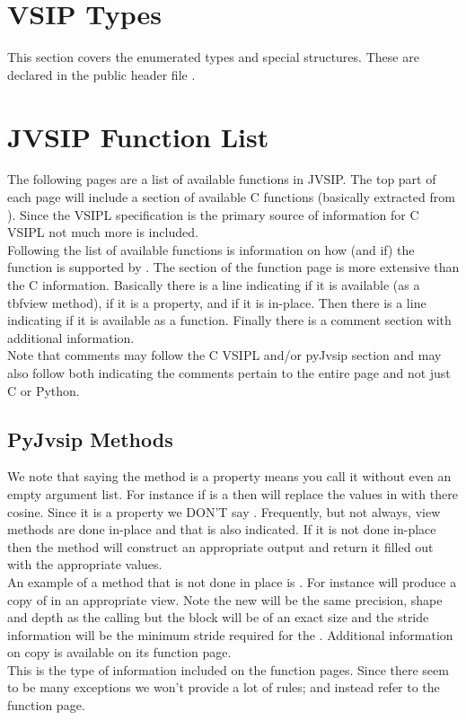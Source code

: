 \section*{VSIP Types}
This section covers the enumerated types and special structures. These are declared in the public header file .
%
\section*{JVSIP Function List}
The following pages are a list of available functions in JVSIP. The top part of each page will include a section of available C functions (basically extracted from ). Since the VSIPL specification is the primary source of information for C VSIPL not much more is included.\\
%
Following the list of available functions is information on how (and if) the function is supported by \pyjv. The \pyjv section of the function page is more extensive than the C information. Basically there is a line indicating if it is available (as a 	tbf{view} method), if it is a property, and if it is in-place. Then there is a line indicating if it is available as a \pyjv function. Finally there is a comment section with additional information.\\
%
Note that comments may follow the C VSIPL and/or pyJvsip section and may also follow both indicating the comments pertain to the entire page and not just C or Python.\\
%
\subsection*{PyJvsip Methods}
We note that saying the method is a property means you call it without even an empty argument list. For instance if  is a \pyjv {} then  will replace the values in  with there cosine. Since it is a property we DON'T say . Frequently, but not always, view methods are done in-place and that is also indicated. If it is not done in-place then the method will construct an appropriate output  and return it filled out with the appropriate values.\\
%
An example of a  method that is not done in place is . For instance  will produce a copy of  in an appropriate view. Note the new  will be the same precision, shape and depth as the calling  but the \ttbf block will be of an exact size and the stride information will be the minimum stride required for the . Additional information on copy is available on its function page.\\
%
This is the type of information included on the function pages. Since there seem to be many exceptions we won't provide a lot of rules; and instead refer to the function page.\\
%
